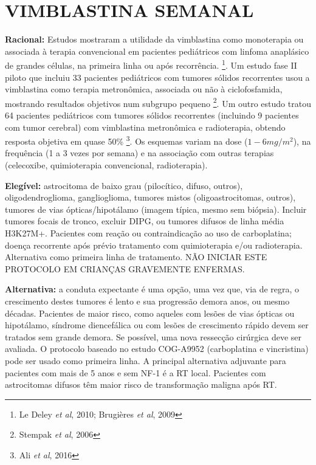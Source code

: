 \documentclass[11pt,a4paper,oldfontcommands]{memoir}
\begin{document}
\section{VIMBLASTINA SEMANAL}
{\let\thefootnote\relax{}}
\textbf{Racional:} Estudos mostraram a utilidade da vimblastina como monoterapia ou associada à terapia convencional em pacientes pediátricos com linfoma anaplásico de grandes células, na primeira linha ou após recorrência.  \footnote{Le Deley \textit{et al}, 2010; Brugières \textit{et al}, 2009}. Um estudo fase II piloto que incluiu 33 pacientes pediátricos com tumores sólidos recorrentes usou a vimblastina como terapia metronômica, associada ou não à ciclofosfamida, mostrando resultados objetivos num subgrupo pequeno \footnote{Stempak \textit{et al}, 2006}. Um outro estudo tratou 64 pacientes pediátricos com tumores sólidos recorrentes (incluindo 9 pacientes com tumor cerebral) com vimblastina metronômica e radioterapia, obtendo resposta objetiva em quase 50\% \footnote{Ali \textit{et al}, 2016}. Os esquemas variam na dose ($1-6 mg/m^2$), na frequência (1 a 3 vezes por semana) e na associação com outras terapias (celecoxibe, quimioterapia convencional, radioterapia). 

\textbf{Elegível:} astrocitoma de baixo grau (pilocítico, difuso, outros), oligodendroglioma, ganglioglioma, tumores mistos (oligoastrocitomas, outros), tumores de vias ópticas/hipotálamo (imagem típica, mesmo sem biópsia). Incluir tumores focais de tronco, excluir DIPG, ou tumores difusos de linha média H3K27M+. Pacientes com reação ou contraindicação ao uso de carboplatina; doença recorrente após prévio tratamento com quimioterapia e/ou radioterapia. Alternativa como primeira linha de tratamento. NÃO INICIAR ESTE PROTOCOLO EM CRIANÇAS GRAVEMENTE ENFERMAS.

\textbf{Alternativa:} a conduta expectante é uma opção, uma vez que, via de regra, o crescimento destes tumores é lento e sua progressão demora anos, ou mesmo décadas. Pacientes de maior risco, como aqueles com lesões de vias ópticas ou hipotálamo, síndrome diencefálica ou com lesões de crescimento rápido devem ser tratados sem grande demora. Se possível, uma nova ressecção cirúrgica deve ser avaliada. O protocolo baseado no estudo COG-A9952 (carboplatina e vincristina) pode ser usado como primeira linha. A principal alternativa adjuvante para pacientes com mais de 5 anos e sem NF-1 é a RT local. Pacientes com astrocitomas difusos têm maior risco de transformação maligna após RT.
\end{document}

